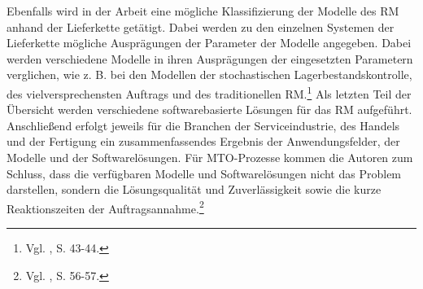 Ebenfalls wird in der Arbeit eine mögliche Klassifizierung der Modelle des RM anhand der Lieferkette getätigt. Dabei werden zu den einzelnen Systemen der Lieferkette mögliche Ausprägungen der Parameter der Modelle angegeben. Dabei werden verschiedene Modelle in ihren Ausprägungen der eingesetzten Parametern verglichen, wie z. B. bei den Modellen der stochastischen Lagerbestandskontrolle, des \glqq vielversprechensten Auftrags{\grqq} und des traditionellen RM.\footnote{Vgl. \cite{quante2009revenue}, S. 43-44.} Als letzten Teil der Übersicht werden verschiedene softwarebasierte Lösungen für das RM aufgeführt. Anschließend erfolgt jeweils für die Branchen der Serviceindustrie, des Handels und der Fertigung ein zusammenfassendes Ergebnis der Anwendungsfelder, der Modelle und der Softwarelösungen. Für MTO-Prozesse kommen die Autoren zum Schluss, dass die verfügbaren Modelle und Softwarelösungen nicht das Problem darstellen, sondern die Lösungsqualität und Zuverlässigkeit sowie die kurze Reaktionszeiten der Auftragsannahme.\footnote{Vgl. \cite{quante2009revenue}, S. 56-57.}

